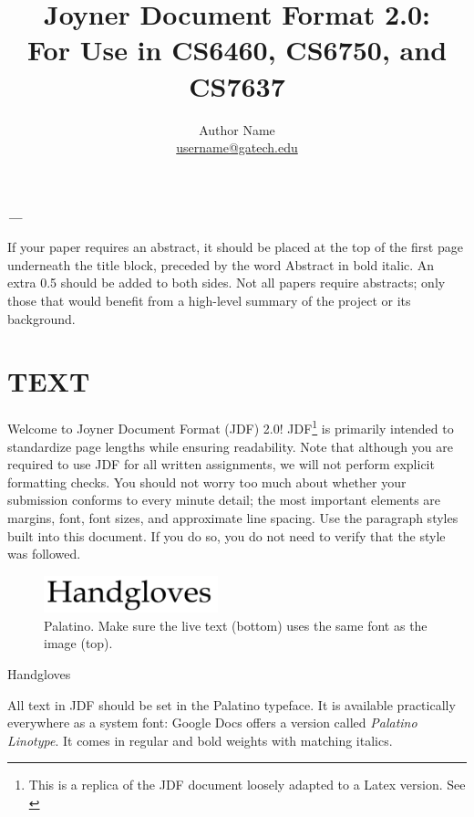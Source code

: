 \documentclass[11pt,a4paper,usenames,dvipsnames]{article}
\title{\LARGE \textbf{Joyner Document Format 2.0:\\
For Use in CS6460, CS6750, and CS7637
} }
\author{Author Name \\ \href{mailto:username@gatech.edu}{username@gatech.edu}}
\date{}
\renewenvironment{abstract}{%
  \list{}{\leftmargin0.5in \rightmargin\leftmargin}
  \item\relax
   \par{\bfseries \noindent \textit{\abstractname—}\nolinebreak} 
}{%
  \endlist \par
}
\begin{document}
\clearpage\maketitle
\maketitle              %
%
\begin{abstract}
If your paper requires an abstract, it should be placed at the top of the first page underneath the title block, preceded by the word Abstract in bold italic. An extra 0.5 should be added to both sides. Not all papers require abstracts; only those that would benefit from a high-level summary of the project or its background.
\end{abstract}

\section{TEXT}
Welcome to Joyner Document Format (JDF) 2.0! JDF\footnote{This is a replica of the JDF document loosely adapted to a Latex version. See \cite{jn2019}} is primarily intended to standardize page lengths while ensuring readability. Note that although you are required to use JDF for all written assignments, we will not perform explicit formatting checks. You should not worry too much about whether your submission conforms to every minute detail; the most important elements are margins, font, font sizes, and approximate line spacing. Use the paragraph styles built into this document. If you do so, you do not need to verify that the style was followed.
\begin{figure}[H]
\centering
\includegraphics[width=0.45\textwidth]{palantino.png}
\caption{\label{fig:pie} Palatino. Make sure the live text (bottom) uses the same font as the image (top).}
\end{figure}
\begin{center}
{\fontsize{30}{30}\selectfont Handgloves}
\end{center}

All text in JDF should be set in the Palatino typeface. It is available practically everywhere as a system font: Google Docs offers a version called \textit{Palatino Linotype}. It comes in regular and bold weights with matching italics.
\end{document}
